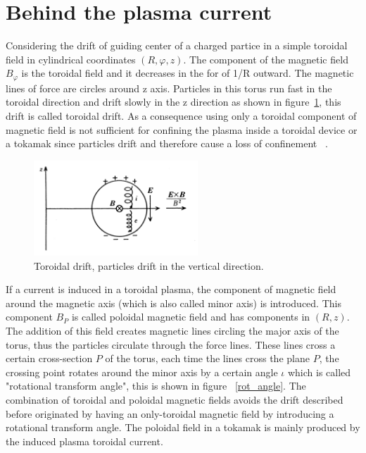 \section{Behind the plasma current}

Considering the drift of guiding center of a charged partice in a simple toroidal field in cylindrical coordinates $(R,\varphi,z)$. The component of the magnetic field $B_\varphi$ is the toroidal field and it decreases in the for of 1/R outward. The magnetic lines of force are circles around z axis. Particles in this  torus run fast in the toroidal direction and drift slowly in the z direction as shown in figure~\ref{TDrift}, this drift is called toroidal drift. As a consequence  using only a toroidal component of magnetic field is not sufficient for confining the plasma inside a toroidal device or a tokamak  since particles drift and therefore cause a loss of confinement ~\cite[Chapter~3]{Miyamoto2011}.\smallskip


\begin{figure}
	\centering
	\includegraphics[width=0.55\textwidth]{Chp1/ToroidalDrift.png}
	\caption{Toroidal drift, particles drift in the vertical direction. ~\cite[Chapter~3]{Miyamoto2011} \label{TDrift}}
\end{figure}



If a current is induced in a toroidal plasma, the component of magnetic field around the magnetic axis (which is also called minor axis) is introduced. This component $B_P$ is called poloidal magnetic field and has components in $(R,z)$. The addition of this field creates magnetic lines circling the major axis of the torus, thus the particles circulate through the force lines. These lines cross a certain cross-section $P$ of the torus, each time the lines cross the plane $P$, the crossing point rotates around the minor axis by a certain angle $\iota$ which is called "rotational transform angle", this is shown in figure ~\ref{rot_angle}. The combination of toroidal and poloidal magnetic fields avoids the drift  described before originated by having an only-toroidal magnetic field by introducing a rotational transform angle. The poloidal field in a tokamak is mainly produced by the induced plasma toroidal current.  \smallskip

